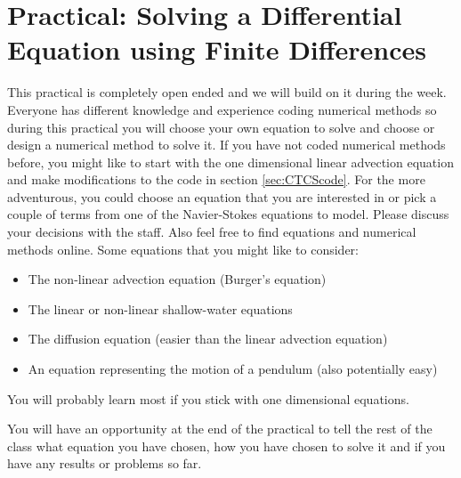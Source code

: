 %
\clearpage{}


\section{Practical: Solving a Differential Equation using Finite Differences}

This practical is completely open ended and we will build on it during
the week. Everyone has different knowledge and experience coding numerical
methods so during this practical you will choose your own equation
to solve and choose or design a numerical method to solve it. If you
have not coded numerical methods before, you might like to start with
the one dimensional linear advection equation and make modifications
to the code in section \ref{sec:CTCScode}. For the more adventurous,
you could choose an equation that you are interested in or pick a
couple of terms from one of the Navier-Stokes equations to model.
Please discuss your decisions with the staff. Also feel free to find
equations and numerical methods online. Some equations that you might
like to consider:
\begin{itemize}
\item The non-linear advection equation (Burger's equation)
\item The linear or non-linear shallow-water equations
\item The diffusion equation (easier than the linear advection equation)
\item An equation representing the motion of a pendulum (also potentially
easy)
\end{itemize}
You will probably learn most if you stick with one dimensional equations. 

You will have an opportunity at the end of the practical to tell the
rest of the class what equation you have chosen, how you have chosen
to solve it and if you have any results or problems so far. %

